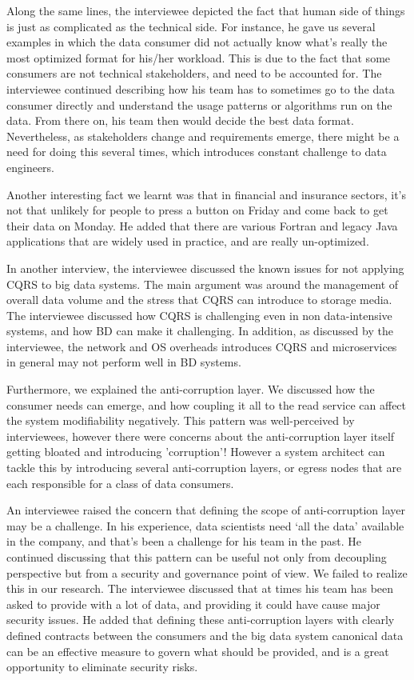 \documentclass{bmcart}
\begin{document}
Along the same lines, the interviewee depicted the fact that human side of things is just as complicated as the technical side. For instance, he gave us several examples in which the data consumer did not actually know what's really the most optimized format for his/her workload. This is due to the fact that some consumers are not technical stakeholders, and need to be accounted for. The interviewee continued describing how his team has to sometimes go to the data consumer directly and understand the usage patterns or algorithms run on the data. From there on, his team then would decide the best data format. Nevertheless, as stakeholders change and requirements emerge, there might be a need for doing this several times, which introduces constant challenge to data engineers.

Another interesting fact we learnt was that in financial and insurance sectors, it's not that unlikely for people to press a button on Friday and come back to get their data on Monday. He added that there are various Fortran and legacy Java applications that are widely used in practice, and are really un-optimized.


In another interview, the interviewee discussed the known issues for not applying CQRS to big data systems. The main argument was around the management of overall data volume and the stress that CQRS can introduce to storage media. The interviewee discussed how CQRS is challenging even in non data-intensive systems, and how BD can make it challenging. In addition, as discussed by the interviewee, the network and OS overheads introduces CQRS and microservices in general \cite{sriraman2018mu} may not perform well in BD systems.

Furthermore, we explained the anti-corruption layer. We discussed how the consumer needs can emerge, and how coupling it all to the read service can affect the system modifiability negatively. This pattern was well-perceived by interviewees, however there were concerns about the anti-corruption layer itself getting bloated and introducing 'corruption'! However a system architect can tackle this by introducing several anti-corruption layers, or egress nodes that are each responsible for a class of data consumers. 

An interviewee raised the concern that defining the scope of anti-corruption layer may be a challenge. In his experience, data scientists need `all the data' available in the company, and that's been a challenge for his team in the past. He continued discussing that this pattern can be useful not only from decoupling perspective but from a security and governance point of view. We failed to realize this in our research. The interviewee discussed that at times his team has been asked to provide with a lot of data, and providing it could have cause major security issues. He added that defining these anti-corruption layers with clearly defined contracts between the consumers and the big data system canonical data can be an effective measure to govern what should be provided, and is a great opportunity to eliminate security risks. 
\end{document}
